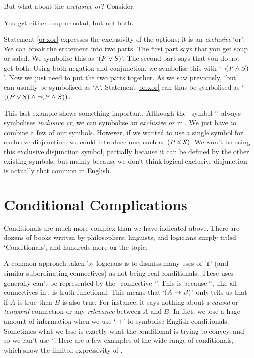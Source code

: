 \documentclass[PHIL101-Textbook.tex]{subfiles}
\begin{document}
But what about the \emph{exclusive or}? Consider: 

\begin{earg}
\item[\ex{or.xor}] You get either soup or salad, but not both.
\end{earg}

\noindent Statement \ref{or.xor} expresses the exclusivity of the options; it is an \emph{exclusive} `or'. We can break the statement into two parts. The first part says that you get soup or salad. We symbolise this as `$(P \vee S)$'. The second part says that you do not get both.
Using both negation and conjunction, we symbolise this with `$\neg(P \land S)$'. Now we just need to put the two parts together. As we saw previously, `but' can usually be symbolised as `$\land$'. Statement \ref{or.xor} can thus be symbolised as `$((P \vee S) \land \neg(P \land S))$'.

This last example shows something important. Although the \tfl\ symbol `\eor' always symbolises \emph{inclusive or}, we can symbolise an \emph{exclusive or} in {\tfl}. We just have to combine a few of our symbols. However, if we wanted to use a single symbol for exclusive disjunction, we could introduce one, such as $(P \veebar S)$. We won't be using this exclusive disjunction symbol, partially because it can be defined by the other existing symbols, but mainly because we don't think logical exclusive disjunction is actually that common in English.



\section{Conditional Complications}

Conditionals are much more complex than we have indicated above. There are dozens of books written by philosophers, linguists, and logicians simply titled `Conditionals', and hundreds more on the topic.

A common approach taken by logicians is to dismiss many uses of `if' (and similar subordinating connectives) as not being real conditionals. These uses generally can't be represented by the \tfl\  connective `\eif'. This is because `\eif', like all connectives in \tfl, is truth functional. This means that `$(A \rightarrow B)$' only tells us that if $A$ is true then $B$ is also true. For instance, it says nothing about a \emph{causal} or \emph{temporal} connection or any \emph{relevance} between $A$ and $B$. In fact, we lose a huge amount of information when we use `$\rightarrow$' to symbolise English conditionals.  Sometimes what we lose is exactly what the conditional is trying to convey, and so we can't use `\eif'. Here are a few examples of the wide range of conditionals, which show the limited expressivity of \tfl.
\end{document}

